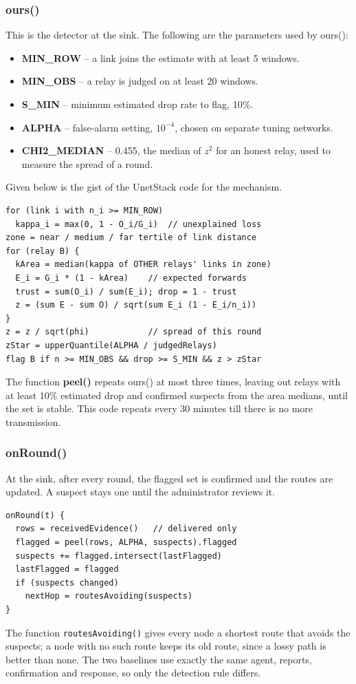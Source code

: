 \documentclass[conference]{IEEEtran}
\begin{document}
\subsubsection{ours()}
This is the detector at the sink. The following are the parameters used by ours():
\begin{itemize}
\item \textbf{MIN\_ROW} -- a link joins the estimate with at least 5 windows.
\item \textbf{MIN\_OBS} -- a relay is judged on at least 20 windows.
\item \textbf{S\_MIN} -- minimum estimated drop rate to flag, 10\%.
\item \textbf{ALPHA} -- false-alarm setting, $10^{-4}$, chosen on separate tuning networks.
\item \textbf{CHI2\_MEDIAN} -- 0.455, the median of $z^2$ for an honest relay, used to measure the spread of a round.
\end{itemize}
Given below is the gist of the UnetStack code for the mechanism.
\begin{lstlisting}
for (link i with n_i >= MIN_ROW)
  kappa_i = max(0, 1 - O_i/G_i)  // unexplained loss
zone = near / medium / far tertile of link distance
for (relay B) {
  kArea = median(kappa of OTHER relays' links in zone)
  E_i = G_i * (1 - kArea)    // expected forwards
  trust = sum(O_i) / sum(E_i); drop = 1 - trust
  z = (sum E - sum O) / sqrt(sum E_i (1 - E_i/n_i))
}
z = z / sqrt(phi)            // spread of this round
zStar = upperQuantile(ALPHA / judgedRelays)
flag B if n >= MIN_OBS && drop >= S_MIN && z > zStar
\end{lstlisting}
The function \textbf{peel()} repeats ours() at most three times, leaving out relays with at least 10\% estimated drop and confirmed suspects from the area medians, until the set is stable. This code repeats every 30 minutes till there is no more transmission.

\subsubsection{onRound()}
At the sink, after every round, the flagged set is confirmed and the routes are updated. A suspect stays one until the administrator reviews it.
\begin{lstlisting}
onRound(t) {
  rows = receivedEvidence()   // delivered only
  flagged = peel(rows, ALPHA, suspects).flagged
  suspects += flagged.intersect(lastFlagged)
  lastFlagged = flagged
  if (suspects changed)
    nextHop = routesAvoiding(suspects)
}
\end{lstlisting}
The function \texttt{routesAvoiding()} gives every node a shortest route that avoids the suspects; a node with no such route keeps its old route, since a lossy path is better than none. The two baselines use exactly the same agent, reports, confirmation and response, so only the detection rule differs.
\end{document}
